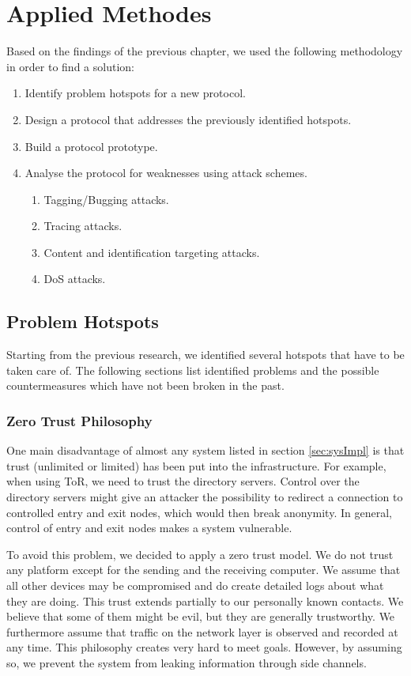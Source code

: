 \chapter{Applied Methodes\label{sec:appliedMethods}}
Based on the findings of the previous chapter, we used the following methodology in order to find a solution:
\begin{enumerate}
	\item Identify problem hotspots for a new protocol.
	\item Design a protocol that addresses the previously identified hotspots.
	\item Build a protocol prototype.
	\item Analyse the protocol for weaknesses using attack schemes.
	\begin{enumerate}
		\item Tagging/Bugging attacks.
		\item Tracing attacks.
		\item Content and identification targeting attacks.
		\item DoS attacks.
	\end{enumerate}
\end{enumerate}

\section{Problem Hotspots}
Starting from the previous research, we identified several hotspots that have to be taken care of. The following sections list identified problems and the possible countermeasures which have not been broken in the past.

\subsection{Zero Trust Philosophy}
One main disadvantage of almost any system listed in section \ref{sec:sysImpl} is that trust (unlimited or limited) has been put into the infrastructure. For example, when using ToR, we need to trust the directory servers. Control over the directory servers might give an attacker the possibility to redirect a connection to controlled entry and exit nodes, which would then break anonymity. In general, control of entry and exit nodes makes a system vulnerable. 

To avoid this problem, we decided to apply a zero trust model. We do not trust any platform except for the sending and the receiving computer. We assume that all other devices may be compromised and do create detailed logs about what they are doing. This trust extends partially to our personally known contacts. We believe that some of them might be evil, but they are generally trustworthy. We furthermore assume that traffic on the network layer is observed and recorded at any time. This philosophy creates very hard to meet goals. However, by assuming so, we prevent the system from leaking information through side channels.

